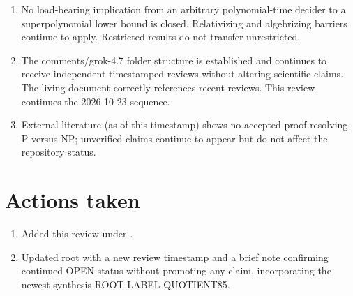 \documentclass[11pt]{article}
\begin{document}
\begin{enumerate}
\item No load-bearing implication from an arbitrary polynomial-time decider to a superpolynomial lower bound is closed. Relativizing and algebrizing barriers continue to apply. Restricted results do not transfer unrestricted.
\item The comments/grok-4.7 folder structure is established and continues to receive independent timestamped reviews without altering scientific claims. The living document correctly references recent reviews. This review continues the 2026-10-23 sequence.
\item External literature (as of this timestamp) shows no accepted proof resolving P versus NP; unverified claims continue to appear but do not affect the repository status.
\end{enumerate}

\section{Actions taken}
\begin{enumerate}
\item Added this review under .
\item Updated root  with a new review timestamp and a brief note confirming continued OPEN status without promoting any claim, incorporating the newest synthesis ROOT-LABEL-QUOTIENT85.
\end{enumerate}
\end{document}
